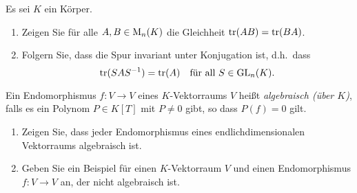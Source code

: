\documentclass[a4paper,10pt]{scrartcl}
\begin{document}
\begin{question}
  Es sei $K$ ein Körper.
  \begin{enumerate}[leftmargin=*]
    \item
      Zeigen Sie für alle $A, B \in \operatorname{M}_n(K)$ die Gleichheit $\operatorname{tr}(AB) = \operatorname{tr}(BA)$.
    \item
      Folgern Sie, dass die Spur invariant unter Konjugation ist, d.h.\ dass
      \[
        \operatorname{tr}(S A S^{-1}) = \operatorname{tr}(A)
        \quad
        \text{für all $S \in \operatorname{GL}_n(K)$}.
      \]
  \end{enumerate}
\end{question}


\begin{question}
  Ein Endomorphismus $f \colon V \to V$ eines $K$-Vektorraums $V$ heißt \emph{algebraisch (über $K$)}, falls es ein Polynom $P \in K[T]$ mit $P \neq 0$ gibt, so dass $P(f) = 0$ gilt.
  \begin{enumerate}[leftmargin=*]
    \item
      Zeigen Sie, dass jeder Endomorphismus eines endlichdimensionalen Vektorraums algebraisch ist.
    \item
      Geben Sie ein Beispiel für einen $K$-Vektorraum $V$ und einen Endomorphismus $f \colon V \to V$ an, der nicht algebraisch ist.
  \end{enumerate}
\end{question}
\end{document}
